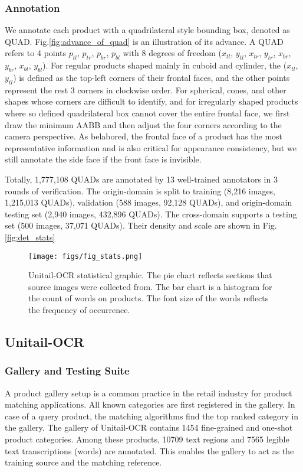 \documentclass[runningheads]{llncs}
\begin{document}
\subsubsection{Annotation} We annotate each product with a quadrilateral style bounding box, denoted as QUAD. Fig.\ref{fig:advance_of_quad} is an illustration of its advance. A QUAD refers to 4 points $p_{tl}$, $p_{tr}$, $p_{br}$, $p_{bl}$ with 8 degrees of freedom ($x_{tl}$, $y_{tl}$, $x_{tr}$, $y_{tr}$, $x_{br}$, $y_{br}$, $x_{bl}$, $y_{bl}$). For regular products shaped mainly in cuboid and cylinder, the ($x_{tl}$,$y_{tl}$) is defined as the top-left corners of their frontal faces, and the other points represent the rest 3 corners in clockwise order. For spherical, cones, and other shapes whose corners are difficult to identify, and for irregularly shaped products where so defined quadrilateral box cannot cover the entire frontal face, we first draw the minimum AABB and then adjust the four corners according to the camera perspective. 
As belabored, the frontal face of a product has the most representative information and is also critical for appearance consistency, but we still annotate the side face if the front face is invisible. 

Totally, 1,777,108 QUADs are annotated by 13 well-trained annotators in 3 rounds of verification. The origin-domain is split to training (8,216 images, 1,215,013 QUADs), validation (588 images, 92,128 QUADs), and origin-domain testing set (2,940 images, 432,896 QUADs). The cross-domain supports a testing set (500 images, 37,071 QUADs). Their density and scale are shown in Fig.\ref{fig:det_stats}

\begin{SCfigure}
    \centering
    \texttt{[image: figs/fig\_stats.png]}
    \caption{Unitail-OCR statistical graphic. The pie chart reflects sections that source images were collected from. The bar chart is a histogram for the count of words on products. The font size of the words reflects the frequency of occurrence.}
    \label{fig:ocr_stats}
\end{SCfigure}

\subsection{Unitail-OCR}

\subsubsection{Gallery and Testing Suite}
A product gallery setup is a common practice in the retail industry for product matching applications. All known categories are first registered in the gallery. In case of a query product, the matching algorithms find the top ranked category in the gallery. 
The gallery of Unitail-OCR contains 1454 fine-grained and one-shot product categories. Among these products, 10709 text regions and 7565 legible text transcriptions (words) are annotated. This enables the gallery to act as the training source and the matching reference.
\end{document}
